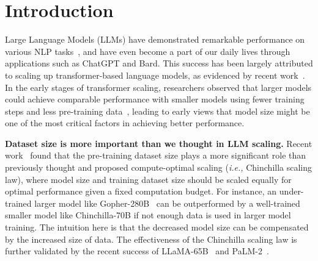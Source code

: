 \documentclass{article}
\newcommand{\ie}{\emph{i.e.,}\xspace}
\newcommand{\yao}[1]{{\color{cyan} YF: #1}}
\begin{document}


\section{Introduction}\label{Introduction}


Large Language Models (LLMs) have demonstrated remarkable performance on various NLP tasks~\citep{2020t5,li2022self}, and have even become a part of our daily lives through applications such as ChatGPT and Bard. This success has been largely attributed to scaling up transformer-based language models, as evidenced by recent work~\citep{kaplan2020scaling, rae2021scaling, tay2021scale}. In the early stages of transformer scaling, researchers observed that larger models could achieve comparable performance with smaller models using fewer training steps and less pre-training data~\citep{kaplan2020scaling}, leading to early views that model size might be one of the most critical factors in achieving better performance. 



\textbf{Dataset size is more important than we thought in LLM scaling.}
Recent work~\citep{hoffmann2022training} found that the pre-training dataset size plays a more significant role than previously thought and proposed compute-optimal scaling (\ie Chinchilla scaling law), where model size and training dataset size should be scaled equally for optimal performance given a fixed computation budget. For instance, an under-trained larger model like Gopher-280B~\citep{rae2021scaling} can be outperformed by a well-trained smaller model like Chinchilla-70B if not enough data is used in larger model training. 
The intuition here is that the decreased model size can be compensated by the increased size of data. 
The effectiveness of the Chinchilla scaling law is further validated by the recent success of LLaMA-65B~\citep{touvron2023llama} and PaLM-2~\citep{anil2023palm}.

\end{document}

